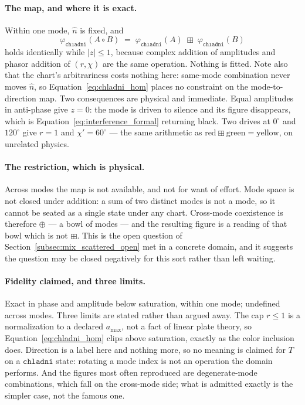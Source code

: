 \documentclass[12pt, a4paper]{article}
\begin{document}
\paragraph{The map, and where it is exact.}
Within one mode, $\hat n$ is fixed, and
\begin{equation}
    \varphi_{\mathtt{chladni}}(A\circ B)
    \;=\;
    \varphi_{\mathtt{chladni}}(A)\;\boxplus\;\varphi_{\mathtt{chladni}}(B)
    \label{eq:chladni_hom}
\end{equation}
holds identically while $|z|\le 1$, because complex addition of
amplitudes and phasor addition of $(r,\chi)$ are the same operation.
Nothing is fitted. Note also that the chart's arbitrariness costs
nothing here: same-mode combination never moves $\hat n$, so
Equation~\eqref{eq:chladni_hom} places no constraint on the
mode-to-direction map. Two consequences are physical and immediate.
Equal amplitudes in anti-phase give $z=0$: the mode is driven to
silence and its figure disappears, which is
Equation~\eqref{eq:interference_formal} returning black. Two drives at
$0^\circ$ and $120^\circ$ give $r=1$ and $\chi'=60^\circ$ --- the same
arithmetic as $\mathrm{red}\boxplus\mathrm{green}=\mathrm{yellow}$,
on unrelated physics.

\paragraph{The restriction, which is physical.}
Across modes the map is not available, and not for want of effort.
Mode space is not closed under addition: a sum of two distinct modes
is not a mode, so it cannot be seated as a single state under any
chart. Cross-mode coexistence is therefore $\oplus$ --- a bowl of
modes --- and the resulting figure is a reading of that bowl which is
not $\boxplus$. This is the open question of
Section~\ref{subsec:mix_scattered_open} met in a concrete domain, and
it suggests the question may be closed negatively for this sort rather
than left waiting.

\paragraph{Fidelity claimed, and three limits.}
Exact in phase and amplitude below saturation, within one mode;
undefined across modes. Three limits are stated rather than argued
away. The cap $r\le 1$ is a normalization to a declared $a_{\max}$,
not a fact of linear plate theory, so
Equation~\eqref{eq:chladni_hom} clips above saturation, exactly as the
color inclusion does. Direction is a label here and nothing more,
so no meaning is claimed for $T$ on a $\mathtt{chladni}$ state:
rotating a mode index is not an operation the domain performs. And the
figures most often reproduced are degenerate-mode combinations, which
fall on the cross-mode side; what is admitted exactly is the simpler
case, not the famous one.
\end{document}
